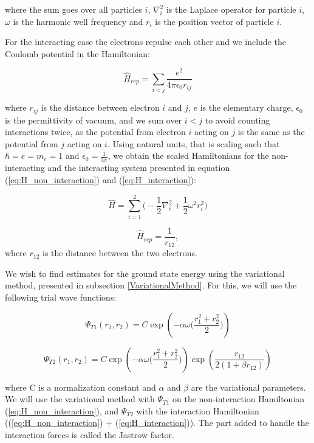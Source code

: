 \documentclass[norsk,a4paper,12pt]{article}
\begin{document}
where the sum goes over all particles $i$, $\nabla_i^2$ is the Laplace operator for particle $i$, $\omega$ is the harmonic well frequency and $r_i$ is the position vector of particle $i$. 

For the interacting case the electrons repulse each other and we include the Coulomb potential in the Hamiltonian:

\begin{equation}
    \hat{H}_{rep} = \sum_{i<j} \frac{e^2}{4\pi \epsilon_0 r_{ij}}
    \label{eq:H_interaction_unit}
\end{equation}

where $r_{ij}$ is the distance between electron $i$ and $j$, $e$ is the elementary charge, $\epsilon_ 0$ is the permittivity of vacuum, and we sum over $i < j$ to avoid counting interactions twice, as the potential from electron $i$ acting on $j$ is the same as the potential from $j$ acting on $i$. Using natural units, that is scaling such that $\hbar = e = m_e = 1$ and $\epsilon_0 = \frac{1}{4\pi}$, we obtain the scaled Hamiltonians for the non-interacting and the interacting system presented in equation (\ref{eq:H_non_interaction}) and (\ref{eq:H_interaction}):

\begin{equation}
    \hat{H} = \sum_{i=1}^{2} \bigg(-\frac{1}{2}\nabla_i^2 + \frac{1}{2} \omega^2r_i^2\bigg) 
    \label{eq:H_non_interaction}
\end{equation}

\begin{equation}
    \hat{H}_{rep} = \frac{1}{r_{12}},
    \label{eq:H_interaction}
\end{equation}
where $r_{12}$ is the distance between the two electrons.

We wish to find estimates for the ground state energy using the variational method, presented in subsection \ref{VariationalMethod}. For this, we will use the following trial wave functions:

\begin{equation}
    \Psi_{T1} (r_1, r_2) = C\exp(-\alpha \omega \Big(\frac{r_1^2 + r_2^2}{2}\Big))
    \label{eq:PsiT1}
\end{equation}

\begin{equation}
    \Psi_{T2}(r_1, r_2) = C\exp(-\alpha \omega \Big(\frac{r_1^2 + r_2^2}{2}\Big))\exp(\frac{r_{12}}{2(1+\beta r_{12})})
    \label{eq:PsiT2}
\end{equation}

where C is a normalization constant and $\alpha$ and $\beta$ are the variational parameters. We will use the variational method with $\Psi_{T1}$ on the non-interaction Hamiltonian (\ref{eq:H_non_interaction}), and $\Psi_{T2}$ with the interaction Hamiltonian ((\ref{eq:H_non_interaction}) + (\ref{eq:H_interaction})). The part added to handle the interaction forces is called the Jastrow factor. \cite{MHJ15}
\end{document}
